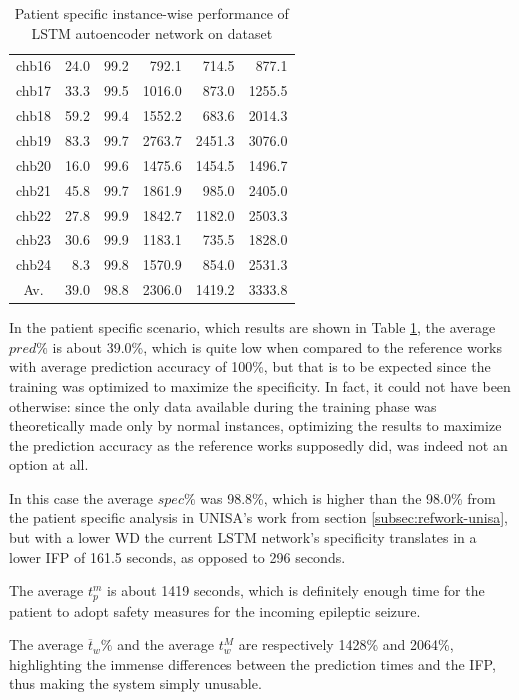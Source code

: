 \begin{table}[ht]
\begin{tabular}{c|rrrrr}
    chb16   & 24.0   & 99.2   & 792.1   & 714.5   & 877.1   \\
    chb17   & 33.3   & 99.5   & 1016.0  & 873.0   & 1255.5  \\
    chb18   & 59.2   & 99.4   & 1552.2  & 683.6   & 2014.3  \\
    chb19   & 83.3   & 99.7   & 2763.7  & 2451.3  & 3076.0  \\
    chb20   & 16.0   & 99.6   & 1475.6  & 1454.5  & 1496.7  \\
    chb21   & 45.8   & 99.7   & 1861.9  & 985.0   & 2405.0  \\
    chb22   & 27.8   & 99.9   & 1842.7  & 1182.0  & 2503.3  \\
    chb23   & 30.6   & 99.9   & 1183.1  & 735.5   & 1828.0  \\
    chb24   & 8.3    & 99.8   & 1570.9  & 854.0   & 2531.3  \\ \hline
    Av.     & 39.0   & 98.8   & 2306.0  & 1419.2  & 3333.8  \\ \hline
    \end{tabular}
    \caption{Patient specific instance-wise performance of LSTM autoencoder network on  dataset}
    \label{tab:patient-specific-lstm-instance} 
\end{table}

In the patient specific scenario, which results are shown in Table \ref{tab:patient-specific-lstm-instance}, the average $pred\%$ is about 39.0\%, which is quite low when compared to the reference works with average prediction accuracy of 100\%, but that is to be expected since the training was optimized to maximize the specificity. In fact, it could not have been otherwise: since the only data available during the training phase was theoretically made only by normal instances, optimizing the results to maximize the prediction accuracy as the reference works supposedly did, was indeed not an option at all.

In this case the average $spec\%$ was 98.8\%, which is higher than the 98.0\% from the patient specific analysis in \gls{UNISA}'s work from section \ref{subsec:refwork-unisa}, but with a lower \gls{WD} the current \gls{LSTM} network's specificity translates in a lower \gls{IFP} of 161.5 seconds, as opposed to 296 seconds.

The average $t_p^m$ is about 1419 seconds, which is definitely enough time for the patient to adopt safety measures for the incoming epileptic seizure.

The average $\overline{t}_w\%$ and the average $t_w^M$ are respectively 1428\% and 2064\%, highlighting the immense differences between the prediction times and the \gls{IFP}, thus making the system simply unusable.


